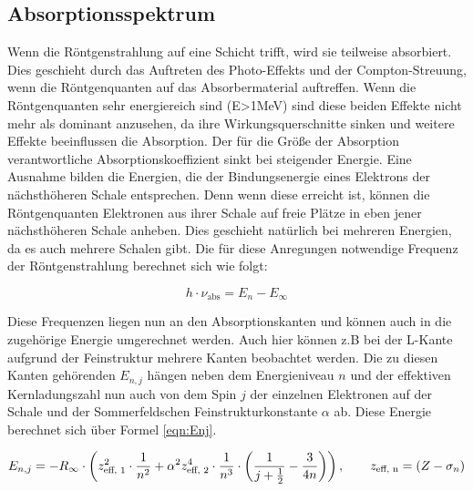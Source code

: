 \documentclass[titlepage = firstcover]{scrartcl}
\begin{document}
        \subsection{Absorptionsspektrum}
            Wenn die Röntgenstrahlung auf eine Schicht trifft, wird sie teilweise absorbiert. Dies geschieht durch das Auftreten des Photo-Effekts und der Compton-Streuung, wenn die Röntgenquanten
            auf das Absorbermaterial auftreffen. Wenn die Röntgenquanten sehr energiereich sind (E>1MeV) sind diese beiden Effekte nicht mehr als dominant anzusehen, da ihre Wirkungsquerschnitte 
            sinken und weitere Effekte beeinflussen die Absorption. Der für die Größe der Absorption verantwortliche Absorptionskoeffizient sinkt bei steigender Energie. Eine Ausnahme bilden die 
            Energien, die der Bindungsenergie eines Elektrons der nächsthöheren Schale entsprechen. Denn wenn diese erreicht ist, können die Röntgenquanten Elektronen aus ihrer Schale auf freie
            Plätze in eben jener nächsthöheren Schale anheben. Dies geschieht natürlich bei mehreren Energien, da es auch mehrere Schalen gibt. Die für diese Anregungen notwendige Frequenz
            der Röntgenstrahlung berechnet sich wie folgt:

            \begin{equation*}
              h \cdot \nu_{\text{abs}} = E_n - E_{\infty}
            \end{equation*}
            
            \noindent
            Diese Frequenzen liegen nun an den Absorptionskanten und können auch in die zugehörige Energie umgerechnet werden. Auch hier können z.B bei der L-Kante aufgrund der Feinstruktur mehrere
            Kanten beobachtet werden. Die zu diesen Kanten gehörenden $E_{n,j}$ hängen neben dem Energieniveau $n$ und der effektiven Kernladungszahl nun auch von dem Spin $j$ der einzelnen Elektronen
            auf der Schale und der Sommerfeldschen Feinstrukturkonstante $\alpha$ ab. Diese Energie berechnet sich über Formel \ref{eqn:Enj}.

            \begin{equation}
              E_{n,j} = -R_{\infty} \cdot \left(z_{\text{eff, 1}}^2 \cdot \frac{1}{n^2} + \alpha ^2 z_{\text{eff, 2}}^4 \cdot \frac{1}{n^3} \cdot \left(\frac{1}{j+\frac{1}{2}} - \frac{3}{4n}\right)\right), \qquad z_{\text{eff, n}} = (Z-\sigma_n)
              \noindent \label{eqn:Enj}
            \end{equation}
            
\end{document}
